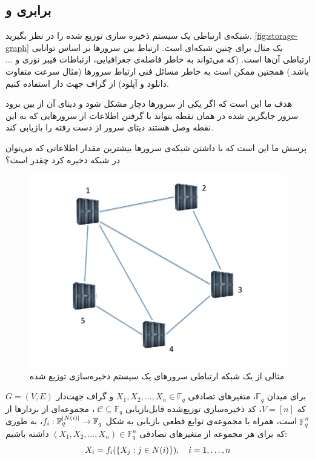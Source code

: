  \subsection{
 برابری 
 \icod
 و
 \SFRDSS
 }
\label{subsec:arya}
 شبکه‌ی ارتباطی یک سیستم ذخیره سازی توزیع شده را در نظر بگیرید.
 \autoref{fig:storage-graph}
 یک مثال برای چنین شبکه‌ای است. ارتباط بین سرورها بر اساس توانایی ارتباطی آن‌ها است. (که می‌تواند به خاطر فاصله‌ی جغرافیایی، ارتباطات فیبر نوری و
 $\text{\ldots}$
 باشد.) همچنین ممکن است به خاطر مسائل فنی ارتباط سرورها (مثال سرعت متفاوت دانلود و آپلود) از گراف جهت دار استفاده کنیم.
 
 هدف ما این است که اگر یکی از سرورها دچار مشکل شود و دیتای آن از بین برود سرور جایگزین شده در همان نقطه بتواند با گرفتن اطلاعات از سرورهایی که به این نقطه وصل هستند دیتای سرور از دست رفته را بازیابی کند.
 
 پرسش ما این است که با داشتن شبکه‌ی سرورها بیشترین مقدار اطلاعاتی که می‌توان در شبکه ذخیره کرد چقدر است؟
\begin{figure}[H]
	\centering
	\includegraphics[width=0.5\linewidth]{figs/chapter6/storage-graph}
	\caption[
	مثالی از یک شبکه ارتباطی سرورهای یک سیستم ذخیره‌سازی توزیع شده]{
		مثالی از یک شبکه ارتباطی سرورهای یک سیستم ذخیره‌سازی توزیع شده
		\cite{arya}
		}
	\label{fig:storage-graph}
\end{figure}

\begin{definition}
	برای میدان
	$\mathbb{F}_{q}$،
	متغیرهای تصادفی
	$X_1, X_2, \ldots, X_n \in \mathbb{F}_{q}$
	و گراف جهت‌دار
	$G = (V, E)$
	که
	$V = [n]$،
		کد ذخیره‌سازی توزیع‌شده قابل‌بازیابی 
		$\mathcal{C} \subseteq \mathbb{F}_{q}$
		،  مجموعه‌ای از بردار‌ها از
		$\mathbb{F}^n_{q}$
		است، همراه با مجموعه‌ی توابع قطعی بازیابی به شکل
		$f_i: \mathbb{F}_q^{\left|{N(i)}\right|} \to \mathbb{F}_q$،
		به طوری که برای هر مجموعه از متغیرهای تصادفی 
		$(X_1, X_2,\dots,X_n) \in \mathbb{F}_q^n$
		داشته باشیم:
		$$X_i = f_i(\left\{ X_j: j \in N(i) \right\}), \quad i = 1,\dots,n$$
\end{definition}

